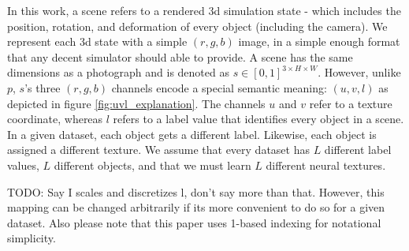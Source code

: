 \documentclass{article}
\begin{document}
	In this work, a scene refers to a rendered 3d simulation state - which includes the position, rotation, and deformation of every object (including the camera).
	We represent each 3d state with a simple $(r,g,b)$ image, in a simple enough format that any decent simulator should able to provide.
	A scene has the same dimensions as a photograph and is denoted as 
	$s \in [0,1]^{3 \times H \times W}$.
	However, unlike $p$, $s$'s three $(r,g,b)$ channels encode a special semantic meaning: $(u,v,l)$ as depicted in figure \ref{fig:uvl_explanation}.
	The channels $u$ and $v$ refer to a texture coordinate, whereas $l$ refers to a label value that identifies every object in a scene.
	In a given dataset, each object gets a different label. Likewise, each object is assigned a different texture.
	We assume that every dataset has $L$ different label values, $L$ different objects, and that we must learn $L$ different neural textures. 


TODO: Say I scales and discretizes l, don't say more than that. 
	However, this mapping can be changed arbitrarily if its more convenient to do so for a given dataset.
	Also please note that this paper uses 1-based indexing for notational simplicity. 






\end{document}
